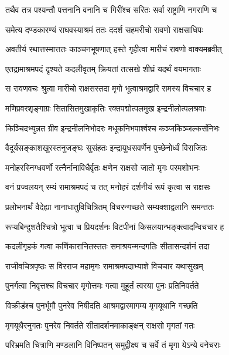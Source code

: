 \twolineshloka
{तथैव तत्र पश्यन्तौ पत्तनानि वनानि च}
{गिरींश्च सरितः सर्वा राष्ट्राणि नगराणि च} %

\twolineshloka
{समेत्य दण्डकारण्यं राघवस्याश्रमं ततः}
{ददर्श सहमरीचो रावणो राक्षसाधिपः} %

\twolineshloka
{अवतीर्य रथात्तस्मात्ततः काञ्चनभूषणात्}
{हस्ते गृहीत्वा मारीचं रावणो वाक्यमब्रवीत्} %

\twolineshloka
{एतद्रामाश्रमपदं दृश्यते कदलीवृतम्}
{क्रियतां तत्सखे शीघ्रं यदर्थं वयमागताः} %

\twolineshloka
{स रावणवचः श्रुत्वा मारीचो राक्षसस्तदा}
{मृगो भूत्वाश्रमद्वारि रामस्य विचचार ह} %

\twolineshloka
{मणिप्रवरशृङ्गाग्रः सितासितमुखाकृतिः}
{रक्तपद्मोत्पलमुख इन्द्रनीलोत्पलश्रवाः} %

\twolineshloka
{किञ्चिदभ्युन्नत ग्रीव इन्द्रनीलनिभोदरः}
{मधूकनिभपार्श्वश्च कञ्जकिञ्जल्कसंनिभः} %

\twolineshloka
{वैदूर्यसङ्काशखुरस्तनुजङ्घः सुसंहतः}
{इन्द्रायुधसवर्णेन पुच्छेनोर्ध्वं विराजितः} %

\twolineshloka
{मनोहरस्निग्धवर्णो रत्नैर्नानाविधैर्वृतः}
{क्षणेन राक्षसो जातो मृगः परमशोभनः} %

\twolineshloka
{वनं प्रज्वलयन् रम्यं रामाश्रमपदं च तत्}
{मनोहरं दर्शनीयं रूपं कृत्वा स राक्षसः} %

\twolineshloka
{प्रलोभनार्थं वैदेह्या नानाधातुविचित्रितम्}
{विचरन्गच्छते सम्यक्शाद्वलानि समन्ततः} %

\twolineshloka
{रूप्यबिन्दुशतैश्चित्रो भूत्वा च प्रियदर्शनः}
{विटपीनां किसलयान्भङ्क्त्वादन्विचचार ह} %

\twolineshloka
{कदलीगृहकं गत्वा कर्णिकारानितस्ततः}
{समाश्रयन्मन्दगतिः सीतासन्दर्शनं तदा} %

\twolineshloka
{राजीवचित्रपृष्ठः स विरराज महामृगः}
{रामाश्रमपदाभ्याशे विचचार यथासुखम्} %

\twolineshloka
{पुनर्गत्वा निवृत्तश्च विचचार मृगोत्तमः}
{गत्वा मुहूर्तं त्वरया पुनः प्रतिनिवर्तते} %

\twolineshloka
{विक्रीडंश्च पुनर्भूमौ पुनरेव निषीदति}
{आश्रमद्वारमागम्य मृगयूथानि गच्छति} %

\twolineshloka
{मृगयूथैरनुगतः पुनरेव निवर्तते}
{सीतादर्शनमाकाङ्क्षन् राक्षसो मृगतां गतः} %

\twolineshloka
{परिभ्रमति चित्राणि मण्डलानि विनिष्पतन्}
{समुद्वीक्ष्य च सर्वे तं मृगा येऽन्ये वनेचराः} %

